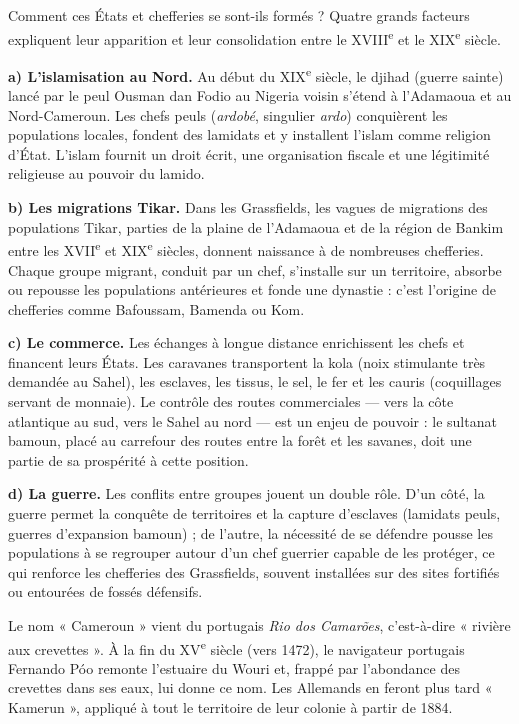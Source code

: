\documentclass[11pt]{article}
\newcommand{\cle}[1]{{\popxbold\color{popdark}#1}}
\begin{document}
Comment ces États et chefferies se sont-ils formés ? Quatre grands facteurs expliquent leur apparition et leur consolidation entre le XVIII\textsuperscript{e} et le XIX\textsuperscript{e} siècle.

\textbf{a) L'islamisation au Nord.} Au début du XIX\textsuperscript{e} siècle, le djihad (guerre sainte) lancé par le peul \cle{Ousman dan Fodio} au Nigeria voisin s'étend à l'Adamaoua et au Nord-Cameroun. Les chefs peuls (\emph{ardobé}, singulier \emph{ardo}) conquièrent les populations locales, fondent des lamidats et y installent l'islam comme religion d'État. L'islam fournit un droit écrit, une organisation fiscale et une légitimité religieuse au pouvoir du lamido.

\textbf{b) Les migrations Tikar.} Dans les Grassfields, les vagues de migrations des populations \cle{Tikar}, parties de la plaine de l'Adamaoua et de la région de Bankim entre les XVII\textsuperscript{e} et XIX\textsuperscript{e} siècles, donnent naissance à de nombreuses chefferies. Chaque groupe migrant, conduit par un chef, s'installe sur un territoire, absorbe ou repousse les populations antérieures et fonde une dynastie : c'est l'origine de chefferies comme Bafoussam, Bamenda ou Kom.

\textbf{c) Le commerce.} Les échanges à longue distance enrichissent les chefs et financent leurs États. Les caravanes transportent la \cle{kola} (noix stimulante très demandée au Sahel), les \cle{esclaves}, les \cle{tissus}, le sel, le fer et les cauris (coquillages servant de monnaie). Le contrôle des routes commerciales — vers la côte atlantique au sud, vers le Sahel au nord — est un enjeu de pouvoir : le sultanat bamoun, placé au carrefour des routes entre la forêt et les savanes, doit une partie de sa prospérité à cette position.

\textbf{d) La guerre.} Les conflits entre groupes jouent un double rôle. D'un côté, la guerre permet la conquête de territoires et la capture d'esclaves (lamidats peuls, guerres d'expansion bamoun) ; de l'autre, la nécessité de se défendre pousse les populations à se regrouper autour d'un chef guerrier capable de les protéger, ce qui renforce les chefferies des Grassfields, souvent installées sur des sites fortifiés ou entourées de fossés défensifs.

\begin{savaistu}
Le nom « Cameroun » vient du portugais \emph{Rio dos Camarões}, c'est-à-dire « rivière aux crevettes ». À la fin du XV\textsuperscript{e} siècle (vers 1472), le navigateur portugais Fernando Póo remonte l'estuaire du Wouri et, frappé par l'abondance des crevettes dans ses eaux, lui donne ce nom. Les Allemands en feront plus tard « Kamerun », appliqué à tout le territoire de leur colonie à partir de 1884.
\end{savaistu}
\end{document}
